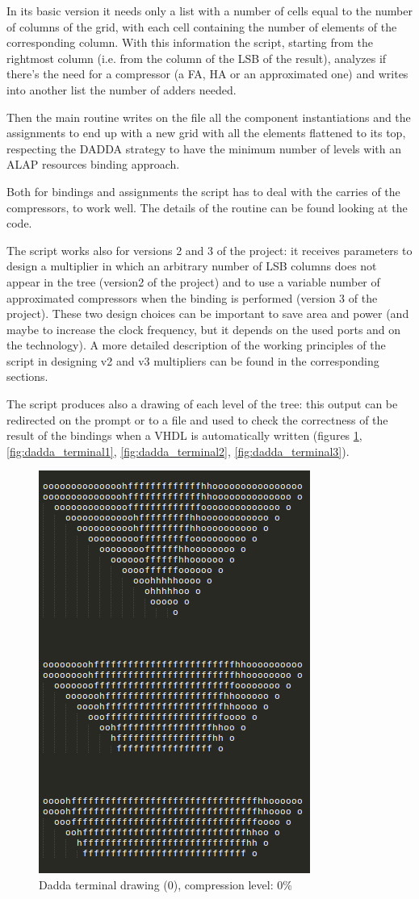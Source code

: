\documentclass[a4paper]{article}
\begin{document}
	In its basic version it needs only a list with a number of cells equal to the number of columns of the grid, with each cell containing the number of elements of the corresponding column. With this information the script, starting from the rightmost column (i.e. from the column of the LSB of the result), analyzes if there's the need for a compressor (a FA, HA or an approximated one) and writes into another list the number of adders needed.

	Then the main routine writes on the file all the component instantiations and the assignments to end up with a new grid with all the elements flattened to its top, respecting the DADDA strategy to have the minimum number of levels with an ALAP resources binding approach.

	Both for bindings and assignments the script has to deal with the carries of the compressors, to work well. The details of the routine can be found looking at the code.

	The script works also for versions 2 and 3 of the project: it receives parameters to design a multiplier in which an arbitrary number of LSB columns does not appear in the tree (version2 of the project) and to use a variable number of approximated compressors when the binding is performed (version 3 of the project). These two design choices can be important to save area and power (and maybe to increase the clock frequency, but it depends on the used ports and on the technology).
	A more detailed description of the working principles of the script in designing v2 and v3 multipliers can be found in the corresponding sections.

	The script produces also a drawing of each level of the tree: this output can be redirected on the prompt or to a file and used to check the correctness of the result of the bindings when a VHDL is automatically written (figures \ref{fig:dadda_terminal0}, \ref{fig:dadda_terminal1}, \ref{fig:dadda_terminal2}, \ref{fig:dadda_terminal3}).

	\begin{figure}[hbtp]
	\centering
	\includegraphics[width=0.5\linewidth]{media/dadda0.png}
	\caption{Dadda terminal drawing (0), compression level: 0\%}
	\label{fig:dadda_terminal0}
	\end{figure}
\end{document}
